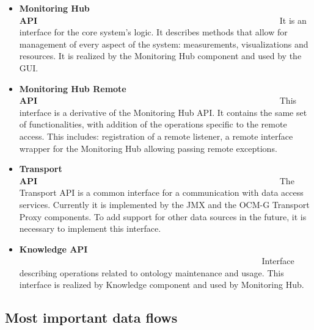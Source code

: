 \begin{itemize}

\item {\bf Monitoring Hub API}~~~~~~~~~~~~~~~~~~~~~~~~~~~~~~~~~~~~~~~~~~~~~~~~~~~~~~~~\linebreak
It is an interface for the core system's logic. It describes methods that allow for management of every aspect of the system:  measurements, visualizations and resources. It is realized by the Monitoring Hub component and used by the GUI. 

\item {\bf Monitoring Hub Remote API}~~~~~~~~~~~~~~~~~~~~~~~~~~~~~~~~~~~~~~~~~~~~~~~~~~~~~~~~\linebreak
This interface is a derivative of the Monitoring Hub API. It contains the same set of functionalities, with addition of the operations specific to the remote access. This includes: registration of a remote listener, a remote interface wrapper for the Monitoring Hub allowing passing remote exceptions.

\item {\bf Transport API}~~~~~~~~~~~~~~~~~~~~~~~~~~~~~~~~~~~~~~~~~~~~~~~~~~~~~~~~\linebreak
The Transport API is a common interface for a communication with data access services. Currently it is implemented by the JMX and the OCM-G Transport Proxy components. To add support for other data sources in the future, it is necessary to implement this interface.

\item {\bf Knowledge API} ~~~~~~~~~~~~~~~~~~~~~~~~~~~~~~~~~~~~~~~~~~~~~~~~~~~~~~~~\linebreak
Interface describing operations related to ontology maintenance and usage. This interface is realized by Knowledge component and used by Monitoring Hub. 

\end{itemize}

\subsection{Most important data flows}


